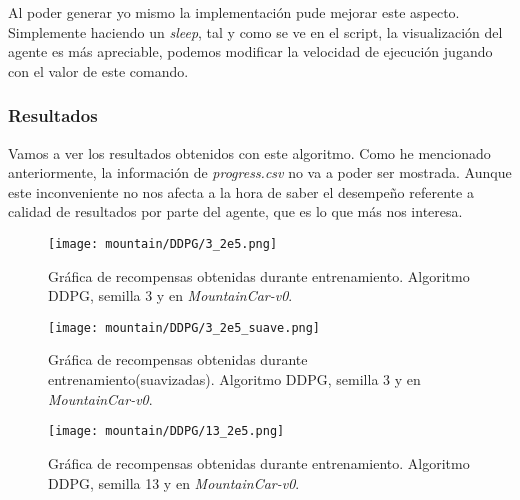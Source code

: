 \documentclass[11pt,fleqn]{book} %
\begin{document}
Al poder generar yo mismo la implementación pude mejorar este aspecto. Simplemente haciendo un \textit{sleep}, tal y como se ve en el script, la visualización del agente es más apreciable, podemos modificar la velocidad de ejecución jugando con el valor de este comando.\\

\subsubsection{Resultados}

Vamos a ver los resultados obtenidos con este algoritmo. Como he mencionado anteriormente, la información de \textit{progress.csv} no va a poder ser mostrada. Aunque este inconveniente no nos afecta a la hora de saber el desempeño referente a calidad de resultados por parte del agente, que es lo que más nos interesa. \\

\begin{figure}[H]
	\centering\texttt{[image: mountain/DDPG/3\_2e5.png]}
	\caption{Gráfica de recompensas obtenidas durante entrenamiento. Algoritmo DDPG, semilla 3 y en \textit{MountainCar-v0}.}
	\label{fig:mountain13} %
\end{figure}

\begin{figure}[H]
	\centering\texttt{[image: mountain/DDPG/3\_2e5\_suave.png]}
	\caption{Gráfica de recompensas obtenidas durante entrenamiento(suavizadas). Algoritmo DDPG, semilla 3 y en \textit{MountainCar-v0}.}
	\label{fig:mountain14} %
\end{figure}

\begin{figure}[H]
	\centering\texttt{[image: mountain/DDPG/13\_2e5.png]}
	\caption{Gráfica de recompensas obtenidas durante entrenamiento. Algoritmo DDPG, semilla 13 y en \textit{MountainCar-v0}.}
	\label{fig:mountain15} %
\end{figure}
\end{document}
